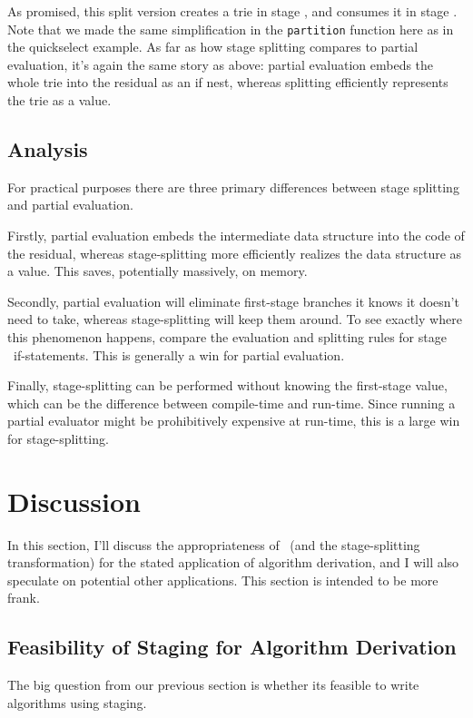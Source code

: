 As promised, this split version creates a trie in stage \bbone, and consumes it in stage \bbtwo.
Note that we made the same simplification in the {\tt partition} function here as in the quickselect example.
As far as how stage splitting compares to partial evaluation, it's again the same story as above:
partial evaluation embeds the whole trie into the residual as an if nest, 
whereas splitting efficiently represents the trie as a value.

\subsection{Analysis}

For practical purposes there are three primary differences between stage splitting and partial evaluation.

Firstly, partial evaluation embeds the intermediate data structure into the code of the residual, whereas
stage-splitting more efficiently realizes the data structure as a value.  This saves, potentially massively, on memory.

Secondly, partial evaluation will eliminate first-stage branches it knows it doesn't need to take,
whereas stage-splitting will keep them around.  
To see exactly where this phenomenon happens, compare the evaluation and splitting rules for stage \bbone\ if-statements.
This is generally a win for partial evaluation.

Finally, stage-splitting can be performed without knowing the first-stage value,
which can be the difference between compile-time and run-time.
Since running a partial evaluator might be prohibitively expensive at run-time, this is a large win for stage-splitting.

\section{Discussion}

In this section, I'll discuss the appropriateness of \lang\ (and the stage-splitting transformation) for the stated application of algorithm derivation, and I will also speculate on potential other applications. This section is intended to be more frank.

\subsection{Feasibility of Staging for Algorithm Derivation}

The big question from our previous section is whether its feasible to write algorithms using staging.  

